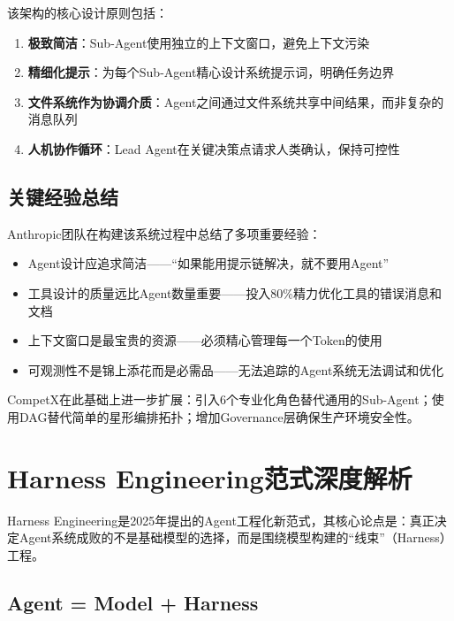 \documentclass[12pt,a4paper]{ctexrep}
\begin{document}
该架构的核心设计原则包括：

\begin{enumerate}[leftmargin=2em]
\item \textbf{极致简洁}：Sub-Agent使用独立的上下文窗口，避免上下文污染
\item \textbf{精细化提示}：为每个Sub-Agent精心设计系统提示词，明确任务边界
\item \textbf{文件系统作为协调介质}：Agent之间通过文件系统共享中间结果，而非复杂的消息队列
\item \textbf{人机协作循环}：Lead Agent在关键决策点请求人类确认，保持可控性
\end{enumerate}

\subsection{关键经验总结}

Anthropic团队在构建该系统过程中总结了多项重要经验：

\begin{keypoint}
\begin{itemize}[leftmargin=1.5em]
\item Agent设计应追求简洁——``如果能用提示链解决，就不要用Agent''
\item 工具设计的质量远比Agent数量重要——投入80\%精力优化工具的错误消息和文档
\item 上下文窗口是最宝贵的资源——必须精心管理每一个Token的使用
\item 可观测性不是锦上添花而是必需品——无法追踪的Agent系统无法调试和优化
\end{itemize}
\end{keypoint}

CompetX在此基础上进一步扩展：引入6个专业化角色替代通用的Sub-Agent；使用DAG替代简单的星形编排拓扑；增加Governance层确保生产环境安全性。

\section{Harness Engineering范式深度解析}

Harness Engineering\cite{harness2025}是2025年提出的Agent工程化新范式，其核心论点是：真正决定Agent系统成败的不是基础模型的选择，而是围绕模型构建的``线束''（Harness）工程。

\subsection{Agent = Model + Harness}
\end{document}
